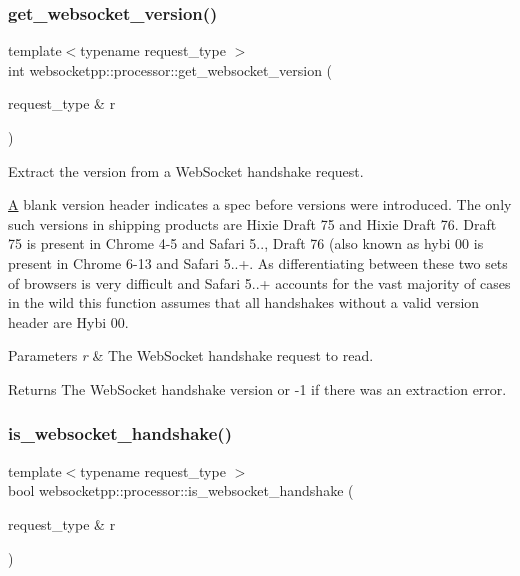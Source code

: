\subsubsection{\texorpdfstring{get\+\_\+websocket\+\_\+version()}{get\_websocket\_version()}}
{\footnotesize\ttfamily template$<$typename request\+\_\+type $>$ \\
int websocketpp\+::processor\+::get\+\_\+websocket\+\_\+version (\begin{DoxyParamCaption}\item[{request\+\_\+type \&}]{r }\end{DoxyParamCaption})}



Extract the version from a Web\+Socket handshake request. 

\mbox{\hyperlink{struct_a}{A}} blank version header indicates a spec before versions were introduced. The only such versions in shipping products are Hixie Draft 75 and Hixie Draft 76. Draft 75 is present in Chrome 4-\/5 and Safari 5.., Draft 76 (also known as hybi 00 is present in Chrome 6-\/13 and Safari 5..+. As differentiating between these two sets of browsers is very difficult and Safari 5..+ accounts for the vast majority of cases in the wild this function assumes that all handshakes without a valid version header are Hybi 00.


\begin{DoxyParams}{Parameters}
{\em r} & The Web\+Socket handshake request to read.\\
\hline
\end{DoxyParams}
\begin{DoxyReturn}{Returns}
The Web\+Socket handshake version or -\/1 if there was an extraction error. 
\end{DoxyReturn}
\mbox{\label{namespacewebsocketpp_1_1processor_a9ff3159b48cf4be2e7cb79c81b155d53}} 
\subsubsection{\texorpdfstring{is\+\_\+websocket\+\_\+handshake()}{is\_websocket\_handshake()}}
{\footnotesize\ttfamily template$<$typename request\+\_\+type $>$ \\
bool websocketpp\+::processor\+::is\+\_\+websocket\+\_\+handshake (\begin{DoxyParamCaption}\item[{request\+\_\+type \&}]{r }\end{DoxyParamCaption})}



